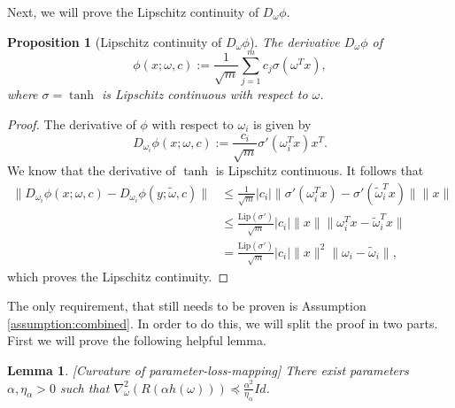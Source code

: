 \documentclass[10pt]{article} %
\newtheorem{proposition}{Proposition}
\newtheorem{lemma}{Lemma}
\begin{document}
Next, we will prove the Lipschitz continuity of $D_\omega \phi$.
\begin{proposition}[Lipschitz continuity of $D_\omega \phi$]
    The derivative $D_\omega \phi$ of 
    $$\phi(x;\omega,c):=\frac{1}{\sqrt{m}}\sum_{j=1}^mc_j\sigma(\omega^T x),$$
    where $\sigma=\tanh$ is Lipschitz continuous with respect to $\omega$.
\end{proposition}
\begin{proof}
    The derivative of $\phi$ with respect to $\omega_{i}$ is given by
    $$D_{\omega_i}\phi(x;\omega,c):=\frac{c_i}{\sqrt{m}}\sigma'(\omega_i^T x) x^T.$$
    We know that the derivative of $\tanh$ is Lipschitz continuous. It follows that
    \begin{align*}
        \|D_{\omega_i}\phi(x;\omega,c)-D_{\omega_i}\phi(y;\tilde{\omega},c)\|&\leq \frac{1}{\sqrt{m}}|c_i|\|\sigma'(\omega_i^Tx)-\sigma'(\tilde{\omega}_i^Tx)\| \|x\|\\
        &\leq \frac{\mathrm{Lip}(\sigma')}{\sqrt{m}}|c_i| \|x\| \|\omega_i^Tx-\tilde{\omega}_i^T x\|\\
        &=\frac{\mathrm{Lip}(\sigma')}{\sqrt{m}}|c_i| \|x\|^2 \|\omega_i-\tilde{\omega}_i \|,
    \end{align*}
    which proves the Lipschitz continuity.
\end{proof}
The only requirement, that still needs to be proven is Assumption \ref{assumption:combined}. In order to do this, we will split the proof in two parts. First we will prove the following helpful lemma.
\begin{lemma}\label{lemma:curgvature}[Curvature of parameter-loss-mapping]
    There exist parameters $\alpha,\eta_\alpha>0$ such that $\nabla^2_\omega(R(\alpha h(\omega)))\preceq \frac{\alpha^2}{\eta_\alpha} Id$.
\end{lemma}
\end{document}
